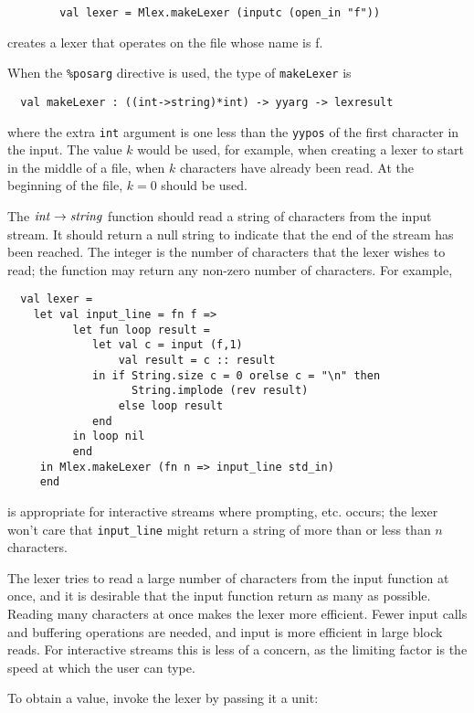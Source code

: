 \begin{verbatim}
        val lexer = Mlex.makeLexer (inputc (open_in "f"))
\end{verbatim}

creates a lexer that operates on the file whose name is f.

When the {\tt \%posarg} directive is used, the type of
{\tt makeLexer} is 
\begin{verbatim}
  val makeLexer : ((int->string)*int) -> yyarg -> lexresult
\end{verbatim}
where the extra {\tt int} argument is one less than the {\tt yypos}
of the first character in the input.  The value $k$ would be used,
for example, when creating
a lexer to start in the middle of a file, when $k$ characters have
already been read.  At the beginning of the file, $k=0$ should be used.

The ${\it int} \rightarrow {\it string}$ function
should read a string of characters
from the input stream.  It should return a null string to indicate
that the end of the stream has been reached.  The integer is the
number of characters that the lexer wishes to read; the function may
return any non-zero number of characters.  For example, 

\begin{verbatim}
  val lexer = 
    let val input_line = fn f =>
          let fun loop result =
             let val c = input (f,1)
                 val result = c :: result
             in if String.size c = 0 orelse c = "\n" then
                   String.implode (rev result)
                 else loop result
             end
          in loop nil
          end
     in Mlex.makeLexer (fn n => input_line std_in)
     end
\end{verbatim}

is appropriate for interactive streams where prompting, etc.  occurs;
the lexer won't care that \verb|input_line| might return a string of more
than or less than $n$ characters.

The lexer tries to read a large number of characters from the input
function at once, and it is desirable that the input function return
as many as possible.  Reading many characters at once makes the lexer
more efficient.  Fewer input calls and buffering operations are
needed, and input is more efficient in large block reads.  For
interactive streams this is less of a concern, as the limiting factor
is the speed at which the user can type.

To obtain a value, invoke the lexer by passing it a unit:

